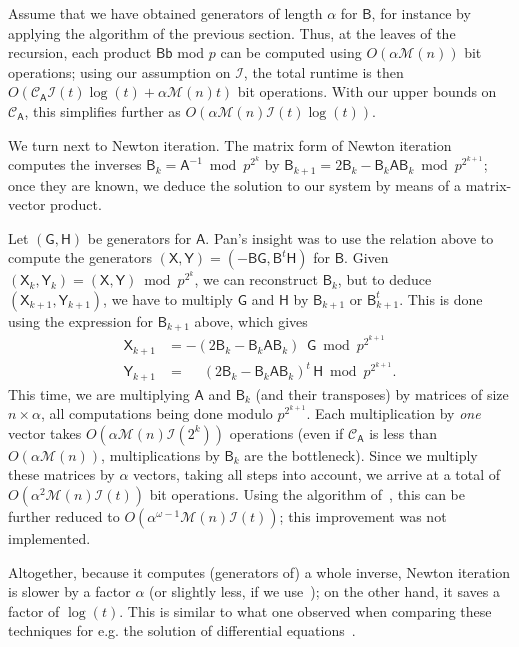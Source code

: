\documentclass[sigconf]{acmart}
\newcommand{\vb}{\ensuremath{\mathsf{b}}}
\newcommand{\mA}{\ensuremath{\mathsf{A}}}
\newcommand{\mB}{\ensuremath{\mathsf{B}}}
\newcommand{\mG}{\ensuremath{\mathsf{G}}}
\newcommand{\mH}{\ensuremath{\mathsf{H}}}
\newcommand{\mX}{\ensuremath{\mathsf{X}}}
\newcommand{\mY}{\ensuremath{\mathsf{Y}}}
\newcommand{\M}{\ensuremath{\mathscr{M}}}
\newcommand{\I}{\ensuremath{\mathscr{I}}}
\newcommand{\CA}{\ensuremath{\mathscr{C}_\mA}}
\theoremstyle{acmdefinition}
\begin{document}
Assume that we have obtained generators of length $\alpha$ for $\mB$,
for instance by applying the algorithm of the previous section.  Thus,
at the leaves of the recursion, each product $\mB \vb$ mod $p$ can be
computed using $O(\alpha \M(n))$ bit operations; using our assumption
on $\I$, the total runtime is then $O(\CA \I(t) \log(t) +\alpha \M(n)
t)$ bit operations. With our upper bounds on $\CA$, this simplifies
further as $O(\alpha \M(n) \I(t) \log(t))$.

We turn next to Newton iteration. The matrix form of Newton iteration
computes the inverses $\mB_k=\mA^{-1} \bmod p^{2^k}$ by $\mB_{k+1} =
2\mB_k - \mB_k \mA \mB_k \bmod p^{2^{k+1}}$; once they are known, we
deduce the solution to our system by means of a matrix-vector product.

Let $(\mG,\mH)$ be generators for $\mA$. Pan's insight was to use the
relation above to compute the generators $(\mX,\mY)=(-\mB
\mG,\mB^{t}\mH)$ for $\mB$. Given $(\mX_k,\mY_k)=(\mX,\mY) \bmod
p^{2^k}$, we can reconstruct $\mB_k$, but to deduce
$(\mX_{k+1},\mY_{k+1})$, we have to multiply $\mG$ and $\mH$ by
$\mB_{k+1}$ or $\mB_{k+1}^t$. This is done using the expression for
$\mB_{k+1}$ above, which gives
\begin{align*}
\mX_{k+1} &= -(2\mB_k - \mB_k \mA \mB_k)\phantom{^t\,} \mG \bmod p^{2^{k+1}}\\
\mY_{k+1} &= \phantom{-}(2\mB_k - \mB_k \mA \mB_k)^t\, \mH \bmod p^{2^{k+1}}.
\end{align*}
This time, we are multiplying $\mA$ and $\mB_k$ (and their transposes)
by matrices of size $n \times \alpha$, all computations being done
modulo $p^{2^{k+1}}$. Each multiplication by {\em one} vector takes
$O(\alpha \M(n) \I(2^k))$ operations (even if $\CA$ is less
than $O(\alpha \M(n))$, multiplications by $\mB_k$ are the
bottleneck). Since we  multiply these matrices by $\alpha$
vectors, taking all steps into account, we arrive at a total of
$O(\alpha^2 \M(n) \I(t))$ bit operations. Using the algorithm
of~\cite{BoJeMoSc16}, this can be further reduced to
$O(\alpha^{\omega-1} \M(n) \I(t))$; this improvement was not
implemented.

Altogether, because it computes (generators of) a whole inverse,
Newton iteration is slower by a factor $\alpha$ (or slightly less, if
we use~\cite{BoJeMoSc16}); on the other hand, it saves a factor of
$\log(t)$. This is similar to what one observed when comparing these
techniques for e.g. the solution of differential
equations~\cite{BoChOlSaScSc07,BoChLeSaSc12}.
\end{document}
